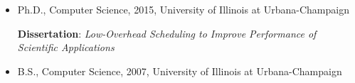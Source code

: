 \begin{itemize}
    \item   Ph.D., Computer Science, 2015, University of Illinois at Urbana-Champaign
    
    \textbf{Dissertation}: \textit{Low-Overhead Scheduling to Improve Performance of Scientific Applications} 
   \item B.S., Computer Science, 2007, University of Illinois at Urbana-Champaign
\end{itemize}